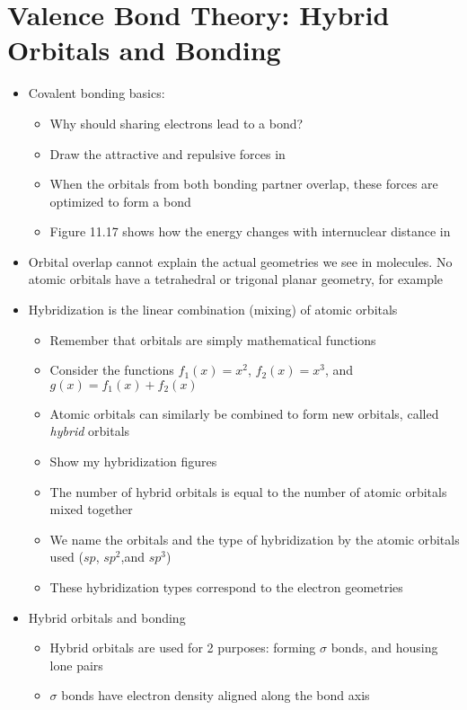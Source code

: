 \documentclass[12pt, openany, letterpaper]{memoir}
\begin{document}
\section{Valence Bond Theory: Hybrid Orbitals and Bonding}
\begin{itemize}
	\item Covalent bonding basics:
	      \begin{itemize}
		      \item Why should sharing electrons lead to a bond?
		      \item Draw the attractive and repulsive forces in 
		      \item When the orbitals from both bonding partner overlap, these forces are optimized to form a bond
		      \item Figure 11.17 shows how the energy changes with internuclear distance in 
	      \end{itemize}
	\item Orbital overlap cannot explain the actual geometries we see in molecules. No atomic orbitals have a tetrahedral or trigonal planar geometry, for example
	\item Hybridization is the linear combination (mixing) of atomic orbitals
	      \begin{itemize}
		      \item Remember that orbitals are simply mathematical functions
		      \item Consider the functions $f_1(x) = x^2$, $f_2(x) = x^3$, and $g(x) = f_1(x) + f_2(x)$
		      \item Atomic orbitals can similarly be combined to form new orbitals, called \emph{hybrid} orbitals
		      \item Show my hybridization figures
		      \item The number of hybrid orbitals is equal to the number of atomic orbitals mixed together
		      \item We name the orbitals and the type of hybridization by the atomic orbitals used ($sp$, $sp^2$,and $sp^3$)
		      \item These hybridization types correspond to the electron geometries
	      \end{itemize}
	\item Hybrid orbitals and bonding
	      \begin{itemize}
		      \item Hybrid orbitals are used for 2 purposes: forming $\sigma$ bonds, and housing lone pairs
		      \item $\sigma$ bonds have electron density aligned along the bond axis

\end{itemize}
\end{itemize}
\end{document}
